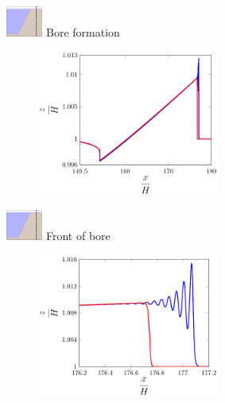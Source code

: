 \documentclass[pdf]{beamer}
\begin{document}
\begin{frame}{\includegraphics[width=1.2cm]{./Pics/Diagram/1n2-figure0.pdf}  \hspace{1cm }  Bore formation }
	\begin{figure}
		\includegraphics[width=6cm]{./Pics/100s.pdf}
	\end{figure}
\end{frame}

\begin{frame}{\includegraphics[width=1.2cm]{./Pics/Diagram/1n2-figure0.pdf}  \hspace{1cm }  Front of bore }
	\begin{figure}
		\includegraphics[width=6cm]{./Pics/SerreBore.pdf}
	\end{figure}
\end{frame}
\end{document}
